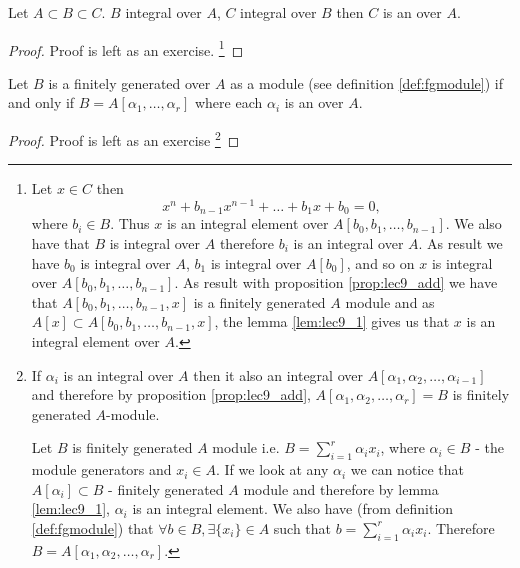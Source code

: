 \begin{proposition}
  Let $A \subset B \subset C$. $B$ integral over $A$, $C$ integral
  over $B$ then $C$ is an  over $A$.
  \begin{proof}
    Proof is left as an exercise.     
    \footnote{
      Let $x \in C$ then
      \[
      x^n + b_{n-1} x^{n-1} + \dots + b_1 x + b_0 = 0,
      \]
      where $b_i \in B$. Thus $x$ is an integral element over
      $A\left[b_0, b_1, \dots, b_{n-1}\right]$. We also have that $B$
      is integral over $A$ therefore $b_i$ is an integral over $A$. As
      result we have $b_0$ is integral over $A$, $b_1$ is integral
      over $A\left[b_0\right]$, and so on $x$ is integral over
       $A\left[b_0, b_1, \dots, b_{n-1}\right]$. As result with
      proposition \ref{prop:lec9_add} we have that
      $A\left[b_0, b_1, \dots, b_{n-1}, x\right]$ is a finitely
      generated $A$ module and as
      $A\left[x\right] \subset A\left[b_0, b_1, \dots, b_{n-1},
        x\right]$, the lemma \ref{lem:lec9_1} gives us that $x$ is an
      integral element over $A$.
    }
  \end{proof}
  \label{prop:lec9_1}
\end{proposition}

\begin{proposition}
  Let $B$ is a finitely generated over $A$ as a module (see definition
  \ref{def:fgmodule}) if and only if
  $B=A\left[\alpha_1, \dots, \alpha_r\right]$ where each $\alpha_i$ is
  an  over $A$.
  \begin{proof}
    Proof is left as an exercise
    \footnote{
      If $\alpha_i$ is an integral over $A$ then it also an integral
      over $A\left[\alpha_1, \alpha_2, \dots, \alpha_{i-1}\right]$ and
      therefore by proposition \ref{prop:lec9_add},
      $A\left[\alpha_1, \alpha_2, \dots, \alpha_r\right] = B$ is finitely
      generated $A$-module.

      Let $B$ is finitely generated $A$ module i.e.
      $B = \sum_{i=1}^r \alpha_i x_i$, where
      $\alpha_i \in B$ - the module generators and $x_i \in A$.
      If we look at any $\alpha_i$ we can notice that
      $A\left[\alpha_i\right] \subset B$ - finitely generated $A$
      module and therefore by lemma \ref{lem:lec9_1},
      $\alpha_i$ is an integral element. We also have (from definition
      \ref{def:fgmodule}) that $\forall b \in B, \exists \{x_i\} \in
      A$ such that $b = \sum_{i=1}^r \alpha_i x_i$. Therefore
      $B = A\left[\alpha_1, \alpha_2, \dots, \alpha_r\right]$.
    }
  \end{proof}
  \label{prop:lec9_2}
\end{proposition}

